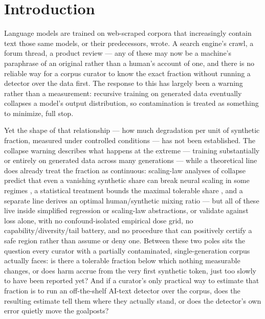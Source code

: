 \documentclass[11pt]{article}
\begin{document}
\section{Introduction}

Language models are trained on web-scraped corpora that increasingly contain text those same models, or their predecessors, wrote. A search engine's crawl, a forum thread, a product review --- any of these may now be a machine's paraphrase of an original rather than a human's account of one, and there is no reliable way for a corpus curator to know the exact fraction without running a detector over the data first. The response to this has largely been a warning rather than a measurement: recursive training on generated data eventually collapses a model's output distribution, so contamination is treated as something to minimize, full stop.

Yet the shape of that relationship --- how much degradation per unit of synthetic fraction, measured under controlled conditions --- has not been established. The collapse warning describes what happens at the extreme --- training substantially or entirely on generated data across many generations --- while a theoretical line does already treat the fraction as continuous: scaling-law analyses of collapse predict that even a vanishing synthetic share can break neural scaling in some regimes \citep{TaleOfTails,StrongModelCollapse}, a statistical treatment bounds the maximal tolerable share \citep{SeddikSyntheticStat}, and a separate line derives an optimal human/synthetic mixing ratio --- but all of these live inside simplified regression or scaling-law abstractions, or validate against loss alone, with no confound-isolated empirical dose grid, no capability/diversity/tail battery, and no procedure that can positively certify a safe region rather than assume or deny one. Between these two poles sits the question every curator with a partially contaminated, single-generation corpus actually faces: is there a tolerable fraction below which nothing measurable changes, or does harm accrue from the very first synthetic token, just too slowly to have been reported yet? And if a curator's only practical way to estimate that fraction is to run an off-the-shelf AI-text detector over the corpus, does the resulting estimate tell them where they actually stand, or does the detector's own error quietly move the goalposts?
\end{document}
